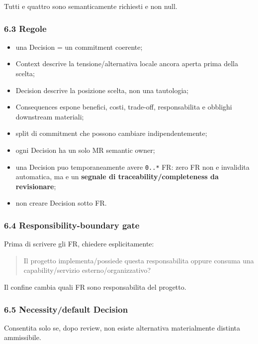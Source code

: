 \documentclass[
  9pt,
  a4paper,
]{article}
\providecommand{\tightlist}{%
  \setlength{\itemsep}{0pt}\setlength{\parskip}{0pt}}
\begin{document}
Tutti e quattro sono semanticamente richiesti e non null.

\subsubsection{6.3 Regole}\label{regole}

\begin{itemize}
\tightlist
\item
  una Decision = un commitment coerente;
\item
  Context descrive la tensione/alternativa locale ancora aperta prima
  della scelta;
\item
  Decision descrive la posizione scelta, non una tautologia;
\item
  Consequences espone benefici, costi, trade-off, responsabilita e
  obblighi downstream materiali;
\item
  split di commitment che possono cambiare indipendentemente;
\item
  ogni Decision ha un solo MR semantic owner;
\item
  una Decision puo temporaneamente avere \texttt{0..*} FR: zero FR non e
  invalidita automatica, ma e un \textbf{segnale di
  traceability/completeness da revisionare};
\item
  non creare Decision sotto FR.
\end{itemize}

\subsubsection{6.4 Responsibility-boundary
gate}\label{responsibility-boundary-gate}

Prima di scrivere gli FR, chiedere esplicitamente:

\begin{quote}
Il progetto implementa/possiede questa responsabilita oppure consuma una
capability/servizio esterno/organizzativo?
\end{quote}

Il confine cambia quali FR sono responsabilita del progetto.

\subsubsection{6.5 Necessity/default
Decision}\label{necessitydefault-decision}

Consentita solo se, dopo review, non esiste alternativa materialmente
distinta ammissibile.
\end{document}
